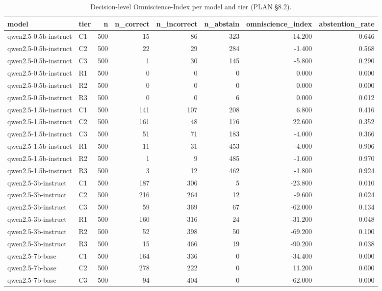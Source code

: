 \begin{table}
\caption{Decision-level Omniscience-Index per model and tier (PLAN §8.2).}
\label{tab:t10_omniscience_index}
\begin{tabular}{llrrrrrr}
\toprule
model & tier & n & n\_correct & n\_incorrect & n\_abstain & omniscience\_index & abstention\_rate \\
\midrule
qwen2.5-0.5b-instruct & C1 & 500 & 15 & 86 & 323 & -14.200 & 0.646 \\
qwen2.5-0.5b-instruct & C2 & 500 & 22 & 29 & 284 & -1.400 & 0.568 \\
qwen2.5-0.5b-instruct & C3 & 500 & 1 & 30 & 145 & -5.800 & 0.290 \\
qwen2.5-0.5b-instruct & R1 & 500 & 0 & 0 & 0 & 0.000 & 0.000 \\
qwen2.5-0.5b-instruct & R2 & 500 & 0 & 0 & 0 & 0.000 & 0.000 \\
qwen2.5-0.5b-instruct & R3 & 500 & 0 & 0 & 6 & 0.000 & 0.012 \\
qwen2.5-1.5b-instruct & C1 & 500 & 141 & 107 & 208 & 6.800 & 0.416 \\
qwen2.5-1.5b-instruct & C2 & 500 & 161 & 48 & 176 & 22.600 & 0.352 \\
qwen2.5-1.5b-instruct & C3 & 500 & 51 & 71 & 183 & -4.000 & 0.366 \\
qwen2.5-1.5b-instruct & R1 & 500 & 11 & 31 & 453 & -4.000 & 0.906 \\
qwen2.5-1.5b-instruct & R2 & 500 & 1 & 9 & 485 & -1.600 & 0.970 \\
qwen2.5-1.5b-instruct & R3 & 500 & 3 & 12 & 462 & -1.800 & 0.924 \\
qwen2.5-3b-instruct & C1 & 500 & 187 & 306 & 5 & -23.800 & 0.010 \\
qwen2.5-3b-instruct & C2 & 500 & 216 & 264 & 12 & -9.600 & 0.024 \\
qwen2.5-3b-instruct & C3 & 500 & 59 & 369 & 67 & -62.000 & 0.134 \\
qwen2.5-3b-instruct & R1 & 500 & 160 & 316 & 24 & -31.200 & 0.048 \\
qwen2.5-3b-instruct & R2 & 500 & 52 & 398 & 50 & -69.200 & 0.100 \\
qwen2.5-3b-instruct & R3 & 500 & 15 & 466 & 19 & -90.200 & 0.038 \\
qwen2.5-7b-base & C1 & 500 & 164 & 336 & 0 & -34.400 & 0.000 \\
qwen2.5-7b-base & C2 & 500 & 278 & 222 & 0 & 11.200 & 0.000 \\
qwen2.5-7b-base & C3 & 500 & 94 & 404 & 0 & -62.000 & 0.000 \\

\end{tabular}
\end{table}
